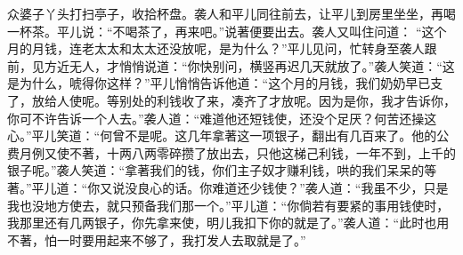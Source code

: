 \begin{parag}


    众婆子丫头打扫亭子，收拾杯盘。袭人和平儿同往前去，让平儿到房里坐坐，再喝一杯茶。平儿说：“不喝茶了，再来吧。”说著便要出去。袭人又叫住问道： “这个月的月钱，连老太太和太太还没放呢，是为什么？”平儿见问，忙转身至袭人跟前，见方近无人，才悄悄说道：“你快别问，横竖再迟几天就放了。”袭人笑道：“这是为什么，唬得你这样？”平儿悄悄告诉他道：“这个月的月钱，我们奶奶早已支了，放给人使呢。等别处的利钱收了来，凑齐了才放呢。因为是你，我才告诉你，你可不许告诉一个人去。”袭人道：“难道他还短钱使，还没个足厌？何苦还操这心。”平儿笑道：“何曾不是呢。这几年拿著这一项银子，翻出有几百来了。他的公费月例又使不著，十两八两零碎攒了放出去，只他这梯己利钱，一年不到，上千的银子呢。”袭人笑道：“拿著我们的钱，你们主子奴才赚利钱，哄的我们呆呆的等著。”平儿道：“你又说没良心的话。你难道还少钱使？”袭人道：“我虽不少，只是我也没地方使去，就只预备我们那一个。”平儿道：“你倘若有要紧的事用钱使时，我那里还有几两银子，你先拿来使，明儿我扣下你的就是了。”袭人道：“此时也用不著，怕一时要用起来不够了，我打发人去取就是了。”
\end{parag}


